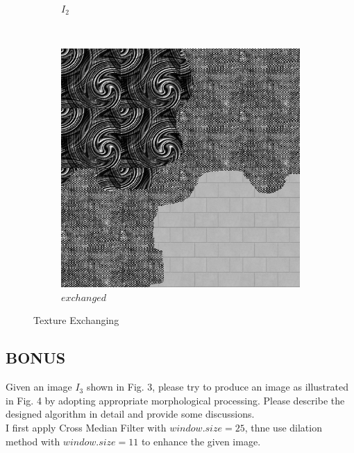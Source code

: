 \documentclass{article}
\begin{document}
\begin{enumerate}[label=(\alph*)]
\begin{figure}[!htb]
\begin{subfigure}[b]{0.3\textwidth}
                \caption{$I_2$}
            \end{subfigure}
            ~
            \begin{subfigure}[b]{0.3\textwidth}
                \includegraphics[width=\textwidth]{img/exchanged.png}
                \caption{$exchanged$}
            \end{subfigure}

            \caption{Texture Exchanging}
        \end{figure}   
    \end{enumerate}
\newpage
\subsection*{BONUS}
Given an image $I_3$ shown in Fig. 3, please try to produce an image as illustrated in Fig. 4 by adopting appropriate morphological processing. Please describe the designed algorithm in detail and provide some discussions. \\

I first apply Cross Median Filter with $window.size = 25$, thne use dilation method with $window.size = 11$ to enhance the given image.
\end{document}
